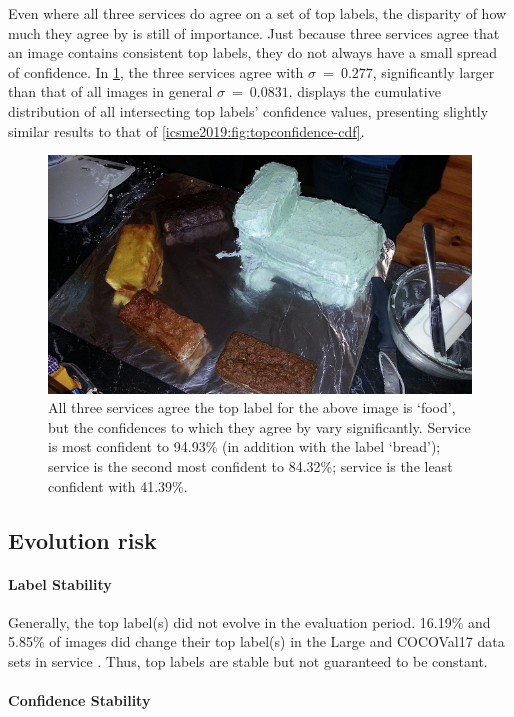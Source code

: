 Even where all three services do agree on a set of top labels, the disparity of how much they agree by is still of importance. Just because three services agree that an image contains consistent top labels, they do not always have a small spread of confidence. In \cref{icsme2019:fig:sample-images:cake}, the three services agree with $\sigma~=~0.277$, significantly larger than that of all images in general $\sigma~=~0.0831$.  displays the cumulative distribution of all intersecting top labels' confidence values, presenting slightly similar results to that of \cref{icsme2019:fig:topconfidence-cdf}.

\begin{figure}
  \centering
  \includegraphics[width=0.55\linewidth]{000000095707}    
  \caption[Agreement of labels between multiple CV services do not share similar confidences]{All three services agree the top label for the above image is `food', but the confidences to which they agree by vary significantly. Service \awsapi{} is most confident to 94.93\% (in addition with the label `bread'); service \googleapi{} is the second most confident to 84.32\%; service \azureapi{} is the least confident with 41.39\%.}
  \label{icsme2019:fig:sample-images:cake}
\end{figure}

\subsection{Evolution risk}

\paragraph{Label Stability}

Generally, the top label(s) did not evolve in the evaluation period. 16.19\% and 5.85\% of images did change their top label(s) in the Large and COCOVal17 data sets in service \googleapi{}. Thus, top labels are stable but not guaranteed to be constant.

\paragraph{Confidence Stability}

